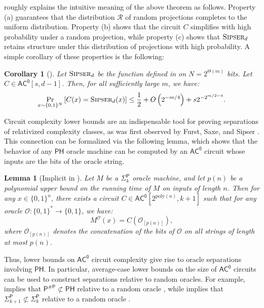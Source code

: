 \documentclass[10pt,a4paper]{article}
\newtheorem{corollary}[theorem]{Corollary}
\newtheorem{lemma}[theorem]{Lemma}
\newcommand{\poly}{\mathrm{poly}}
\newcommand{\Sipser}{\normalfont\textsc{Sipser}}
\begin{document}
\cite{HRST17} roughly explains the intuitive meaning of the above theorem as follows. Property (a) guarantees that the distribution $\mathcal{R}$ of random projections completes to the uniform distribution. Property (b) shows that the circuit $C$ simplifies with high probability under a random projection, while property (c) shows that $\Sipser_{d}$ retains structure under this distribution of projections with high probability. A simple corollary of these properties is the following:

\begin{corollary}[{\cite[Theorem 10.1]{HRST17}}]
\label{cor:hrst_ac0_depth_hierarchy}
Let $\Sipser_d$ be the function defined in  on $N = 2^{\Theta(m)}$ bits. Let $C \in \mathsf{AC^0}[s, d-1]$. Then, for all sufficiently large $m$, we have:
\[
\Pr_{x \sim \{0,1\}^N}\left[C(x) = \Sipser_d(x)\right] \le \frac{1}{2} + O\left(2^{-m/4}\right) + s2^{-2^{m/2 - 4}}.
\]
\end{corollary}

Circuit complexity lower bounds are an indispensable tool for proving separations of relativized complexity classes, as was first observed by Furst, Saxe, and Sipser \cite{FSS84}. This connection can be formalized via the following lemma, which shows that the behavior of any $\mathsf{PH}$ oracle machine can be computed by an $\mathsf{AC^0}$ circuit whose inputs are the bits of the oracle string.

\begin{lemma}[{Implicit in \cite[Lemma 2.3]{FSS84}}]
\label{lem:furst-saxe-sipser}
Let $M$ be a $\mathsf{\Sigma}_k^{\mathsf{P}}$ oracle machine, and let $p(n)$ be a polynomial upper bound on the running time of $M$ on inputs of length $n$. Then for any $x \in \{0,1\}^n$, there exists a circuit $C \in \mathsf{AC^0}\left[2^{\poly(n)}, k+1\right]$ such that for any oracle $\mathcal{O}: \{0,1\}^* \to \{0,1\}$, we have:
\[
M^\mathcal{O}(x) = C\left(\mathcal{O}_{[p(n)]}\right),
\]
where $\mathcal{O}_{[p(n)]}$ denotes the concatenation of the bits of $\mathcal{O}$ on all strings of length at most $p(n)$.
\end{lemma}

Thus, lower bounds on $\mathsf{AC^0}$ circuit complexity give rise to oracle separations involving $\mathsf{PH}$. In particular, average-case lower bounds on the size of $\mathsf{AC^0}$ circuits can be used to construct separations relative to random oracles. For example,  implies that $\mathsf{P^{\# P}} \not\subset \mathsf{PH}$ relative to a random oracle \cite{Has87}, while  implies that $\mathsf{\Sigma}_{k+1}^\mathsf{P} \not\subset \mathsf{\Sigma}_k^\mathsf{P}$ relative to a random oracle \cite{HRST17,RST15}.
\end{document}
